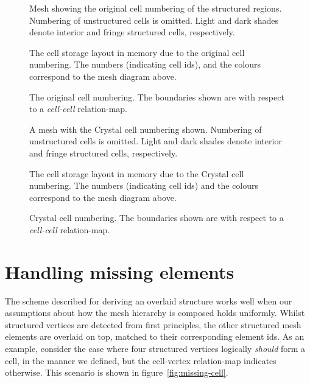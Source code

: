 

\newlength{\charheight}

\begin{figure}[H]
\sidebysidevertical
{
	
	\caption{Mesh showing the original cell numbering of the structured regions. Numbering of unstructured cells is omitted. Light and dark shades denote interior and fringe structured cells, respectively.}
}
{
	\small
	\tabcolsep=0.32mm
	
	\caption{The cell storage layout in memory due to the original cell numbering. The numbers (indicating cell ids), and the colours correspond to the mesh diagram above.}
}
\caption{The original cell numbering. The boundaries shown are with respect to a \emph{cell-cell} relation-map.}
\label{fig:original-numbering}
\end{figure}


\begin{figure}[H]
\sidebysidevertical
{
	
	\caption{A mesh with the Crystal cell numbering shown. Numbering of unstructured cells is omitted. Light and dark shades denote interior and fringe structured cells, respectively.}
}
{
	\small
	\tabcolsep=0.32mm
	
	\caption{The cell storage layout in memory due to the Crystal cell numbering. The numbers (indicating cell ids) and the colours correspond to the mesh diagram above.}
}
\caption{Crystal cell numbering. The boundaries shown are with respect to a \emph{cell-cell} relation-map.}
\label{fig:renumbering}
\end{figure}


\section{Handling missing elements}
\label{sec:missing-elements}
The scheme described for deriving an overlaid structure works well when our assumptions about how the mesh hierarchy is composed holds uniformly. Whilst structured vertices are detected from first principles, the other structured mesh elements are overlaid on top, matched to their corresponding element ids. As an example, consider the case where four structured vertices logically \emph{should} form a cell, in the manner we defined, but the cell-vertex relation-map indicates otherwise. This scenario is shown in figure~\ref{fig:missing-cell}.


